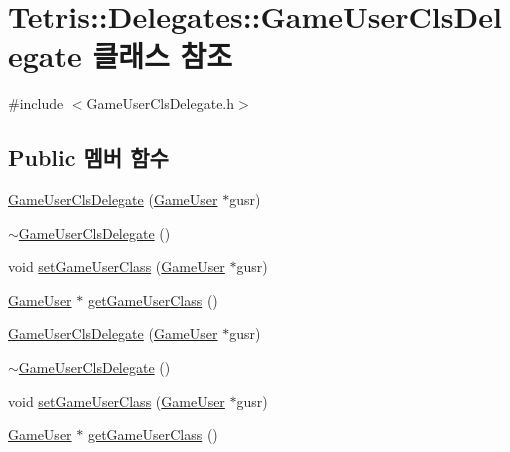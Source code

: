 \hypertarget{class_tetris_1_1_delegates_1_1_game_user_cls_delegate}{}\section{Tetris\+:\+:Delegates\+:\+:Game\+User\+Cls\+Delegate 클래스 참조}
\label{class_tetris_1_1_delegates_1_1_game_user_cls_delegate}


{\ttfamily \#include $<$Game\+User\+Cls\+Delegate.\+h$>$}

\subsection*{Public 멤버 함수}
\begin{DoxyCompactItemize}
\item 
\hyperlink{class_tetris_1_1_delegates_1_1_game_user_cls_delegate_a0b4ced1872f2e51b74a3960f3a290899}{Game\+User\+Cls\+Delegate} (\hyperlink{class_tetris_1_1_users_1_1_game_user}{Game\+User} $\ast$gusr)
\item 
\hyperlink{class_tetris_1_1_delegates_1_1_game_user_cls_delegate_ab521a388ac26f96859d65a30787732fd}{$\sim$\+Game\+User\+Cls\+Delegate} ()
\item 
void \hyperlink{class_tetris_1_1_delegates_1_1_game_user_cls_delegate_aeaab0cab245cb8aca26258f1460498c4}{set\+Game\+User\+Class} (\hyperlink{class_tetris_1_1_users_1_1_game_user}{Game\+User} $\ast$gusr)
\item 
\hyperlink{class_tetris_1_1_users_1_1_game_user}{Game\+User} $\ast$ \hyperlink{class_tetris_1_1_delegates_1_1_game_user_cls_delegate_acefed7c7dfce29e178e3d94dd02d5cf2}{get\+Game\+User\+Class} ()
\item 
\hyperlink{class_tetris_1_1_delegates_1_1_game_user_cls_delegate_a0b4ced1872f2e51b74a3960f3a290899}{Game\+User\+Cls\+Delegate} (\hyperlink{class_tetris_1_1_users_1_1_game_user}{Game\+User} $\ast$gusr)
\item 
\hyperlink{class_tetris_1_1_delegates_1_1_game_user_cls_delegate_ab521a388ac26f96859d65a30787732fd}{$\sim$\+Game\+User\+Cls\+Delegate} ()
\item 
void \hyperlink{class_tetris_1_1_delegates_1_1_game_user_cls_delegate_aeaab0cab245cb8aca26258f1460498c4}{set\+Game\+User\+Class} (\hyperlink{class_tetris_1_1_users_1_1_game_user}{Game\+User} $\ast$gusr)
\item 
\hyperlink{class_tetris_1_1_users_1_1_game_user}{Game\+User} $\ast$ \hyperlink{class_tetris_1_1_delegates_1_1_game_user_cls_delegate_aabfee2bf7c1db3686109f31a5db9f5b4}{get\+Game\+User\+Class} ()
\end{DoxyCompactItemize}
